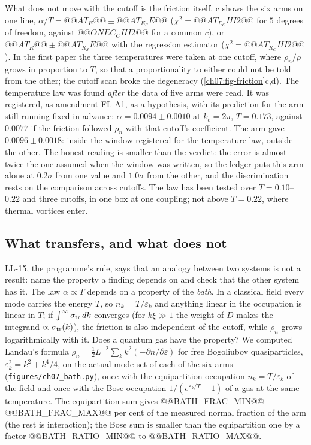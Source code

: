What does not move with the cutoff is the friction itself. c shows the six arms on one line, $\alpha/T=@@AT_E@@\pm@@AT_E_SE@@$ ($\chi^2=@@AT_E_CHI2@@$ for $5$ degrees of freedom, against $@@ONEC_CHI2@@$ for a common $c$), or $@@AT_R@@\pm@@AT_R_SE@@$ with the regression estimator ($\chi^2=@@AT_R_CHI2@@$). In the first paper the three temperatures were taken at one cutoff, where
$\rho_n/\rho$ grows in proportion to $T$, so that a proportionality to either could not be told from the other; the cutoff scan broke the degeneracy (\cref{ch07:fig-friction}c,d). The temperature law was found \emph{after} the data of five arms were read. It was registered, as amendment FL-A1, as a hypothesis, with its prediction for the arm still running fixed in advance: $\alpha=0.0094\pm0.0010$ at
$k_c=2\pi$, $T=0.173$, against $0.0077$ if the friction followed $\rho_n$ with that cutoff's coefficient. The arm gave $0.0096\pm0.0018$: inside the window registered for the temperature law, outside the other. The honest reading is smaller than the verdict: the error is almost twice the one assumed when the window was written, so the ledger puts this arm alone at $0.2\sigma$ from one value and $1.0\sigma$ from the other, and the
discrimination rests on the comparison across cutoffs. The law has been tested over $T=0.10$--$0.22$ and three cutoffs, in one box at one coupling; not above $T=0.22$, where thermal vortices enter.

\subsection*{What transfers, and what does not}

LL-15, the programme's rule, says that an analogy between two systems is not a result: name the property a finding depends on and check that the other system has it. The law $\alpha\propto T$ depends on a property of the \emph{bath}. In a classical field every mode carries the energy $T$, so $n_k=T/\varepsilon_k$ and anything linear in the occupation is linear in $T$; if
$\int^\infty\sigma_{\rm tr}\,dk$ converges (for $k\xi\gg1$ the weight of $D$ makes the integrand $\propto\sigma_{\rm tr}(k)$), the friction is also independent of the cutoff, while $\rho_n$ grows logarithmically with it. Does a quantum gas have the property? We computed Landau's formula $\rho_n=\tfrac12L^{-2}\sum_kk^2(-\partial n/\partial\varepsilon)$ for free Bogoliubov quasiparticles, $\varepsilon_k^2=k^2+k^4/4$, on the actual mode set of each of the six arms (\texttt{figures/ch07\_bath.py}), once with the equipartition occupation $n_k=T/\varepsilon_k$ of the field and once with the Bose occupation $1/(e^{\varepsilon_k/T}-1)$ of a gas at the same temperature. The equipartition sum gives @@BATH_FRAC_MIN@@--@@BATH_FRAC_MAX@@ per cent of the measured normal fraction of the arm (the rest is interaction); the Bose sum is smaller than the equipartition one by a factor @@BATH_RATIO_MIN@@ to @@BATH_RATIO_MAX@@.

